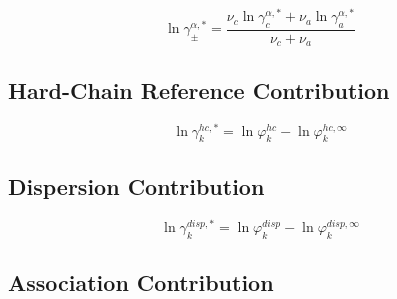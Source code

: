 \documentclass[12pt, letterpaper]{article}
\begin{document}

\begin{equation}
    \ln\gamma_{\pm}^{\alpha,*}
    =
    \frac{\nu_{c}\ln\gamma_{c}^{\alpha,*}+\nu_{a}\ln\gamma_{a}^{\alpha,*}}{\nu_{c}+\nu_{a}}
    \label{eq:lngamma_pm_alpha_asym}
\end{equation}

\subsection{Hard-Chain Reference Contribution}


\begin{equation}
    \ln\gamma_{k}^{hc,*}
    =
    \ln\varphi_{k}^{hc}
    -
    \ln\varphi_{k}^{hc,\infty}
    \label{eq:lngamma_hc_asym}
\end{equation}

\subsection{Dispersion Contribution}


\begin{equation}
    \ln\gamma_{k}^{disp,*}
    =
    \ln\varphi_{k}^{disp}
    -
    \ln\varphi_{k}^{disp,\infty}
    \label{eq:lngamma_disp_asym}
\end{equation}

\subsection{Association Contribution}
\end{document}
